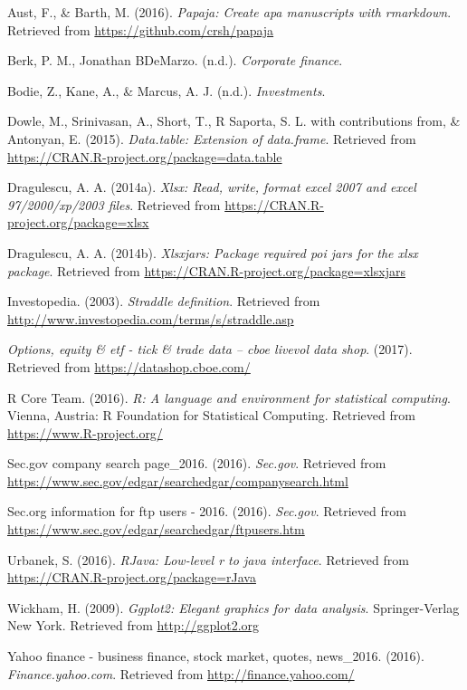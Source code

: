 \documentclass[english,man]{apa6}
\begin{document}
\setlength{\parindent}{-0.5in} \setlength{\leftskip}{0.5in}

\hypertarget{refs}{}
\hypertarget{ref-R-papaja}{}
Aust, F., \& Barth, M. (2016). \emph{Papaja: Create apa manuscripts with
rmarkdown}. Retrieved from \url{https://github.com/crsh/papaja}

\hypertarget{ref-berkdemarzo}{}
Berk, P. M., Jonathan BDeMarzo. (n.d.). \emph{Corporate finance}.

\hypertarget{ref-bodie}{}
Bodie, Z., Kane, A., \& Marcus, A. J. (n.d.). \emph{Investments}.

\hypertarget{ref-R-data.table}{}
Dowle, M., Srinivasan, A., Short, T., R Saporta, S. L. with
contributions from, \& Antonyan, E. (2015). \emph{Data.table: Extension
of data.frame}. Retrieved from
\url{https://CRAN.R-project.org/package=data.table}

\hypertarget{ref-R-xlsx}{}
Dragulescu, A. A. (2014a). \emph{Xlsx: Read, write, format excel 2007
and excel 97/2000/xp/2003 files}. Retrieved from
\url{https://CRAN.R-project.org/package=xlsx}

\hypertarget{ref-R-xlsxjars}{}
Dragulescu, A. A. (2014b). \emph{Xlsxjars: Package required poi jars for
the xlsx package}. Retrieved from
\url{https://CRAN.R-project.org/package=xlsxjars}

\hypertarget{ref-straddle}{}
Investopedia. (2003). \emph{Straddle definition}. Retrieved from
\url{http://www.investopedia.com/terms/s/straddle.asp}

\hypertarget{ref-CBOE}{}
\emph{Options, equity \& etf - tick \& trade data -- cboe livevol data
shop}. (2017). Retrieved from \url{https://datashop.cboe.com/}

\hypertarget{ref-R-base}{}
R Core Team. (2016). \emph{R: A language and environment for statistical
computing}. Vienna, Austria: R Foundation for Statistical Computing.
Retrieved from \url{https://www.R-project.org/}

\hypertarget{ref-sec_1}{}
Sec.gov \textbar{} company search page\_2016. (2016). \emph{Sec.gov}.
Retrieved from
\url{https://www.sec.gov/edgar/searchedgar/companysearch.html}

\hypertarget{ref-sec_2}{}
Sec.org \textbar{} information for ftp users - 2016. (2016).
\emph{Sec.gov}. Retrieved from
\url{https://www.sec.gov/edgar/searchedgar/ftpusers.htm}

\hypertarget{ref-R-rJava}{}
Urbanek, S. (2016). \emph{RJava: Low-level r to java interface}.
Retrieved from \url{https://CRAN.R-project.org/package=rJava}

\hypertarget{ref-R-ggplot2}{}
Wickham, H. (2009). \emph{Ggplot2: Elegant graphics for data analysis}.
Springer-Verlag New York. Retrieved from \url{http://ggplot2.org}

\hypertarget{ref-yahoo_1}{}
Yahoo finance - business finance, stock market, quotes, news\_2016.
(2016). \emph{Finance.yahoo.com}. Retrieved from
\url{http://finance.yahoo.com/}
\end{document}
